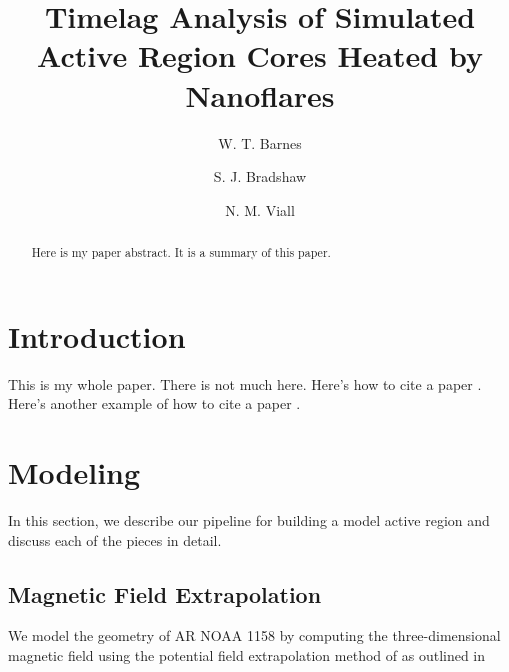 \documentclass[modern,linenumbers]{aastex62}
\begin{document}
\title{Timelag Analysis of Simulated Active Region Cores Heated by Nanoflares}

\author[0000-0001-9642-6089]{W. T. Barnes}
\author{S. J. Bradshaw}
\author{N. M. Viall}

\begin{abstract}
Here is my paper abstract. It is a summary of this paper.
\end{abstract}



\section{Introduction}\label{introduction}

This is my whole paper. There is not much here. Here's how to cite a
paper \citet{viall_evidence_2012}. Here's another example of how to cite
a paper \citep{warren_constraints_2011}.


\section{Modeling}
\label{modeling}
In this section, we describe our pipeline for building a model active region and discuss each of the pieces in detail.

\subsection{Magnetic Field Extrapolation}
\label{field}

We model the geometry of AR NOAA 1158 by computing the three-dimensional magnetic field using the potential field extrapolation method of \citet{schmidt_observable_1964} as outlined in 
\end{document}
